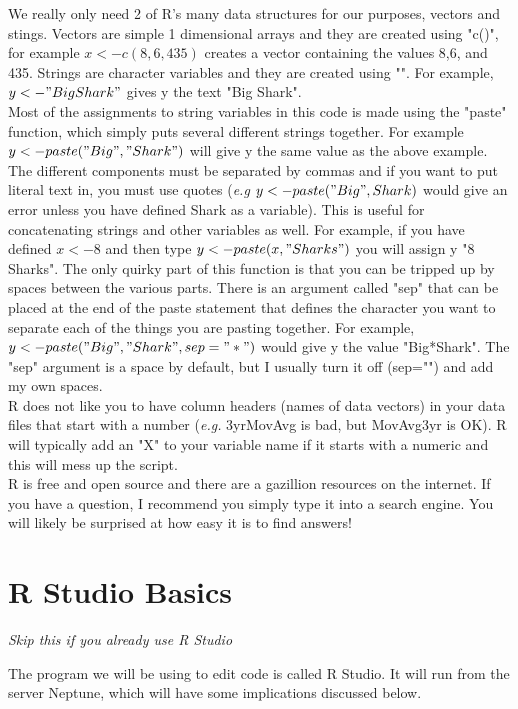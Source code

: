 \documentclass[]{report}
\begin{document}
We really only need 2 of R's many data structures for our purposes, vectors and stings. Vectors are simple 1 dimensional arrays and they are created using "c()", for example $x<-c(8,6,435)$ creates a vector containing the values 8,6, and 435.  Strings are character variables and they are created using "".  For example, $y<-"Big Shark"$ gives y the text "Big Shark".  \\

Most of the assignments to string variables in this code is made using the "paste" function, which simply puts several different strings together.  For example $y<-paste("Big","Shark")$ will give y the same value as the above example.  The different components must be separated by commas and if you want to put literal text in, you must use quotes (\textit{e.g} $y<-paste("Big",Shark)$ would give an error unless you have defined Shark as a variable).  This is useful for concatenating strings and other variables as well.  For example, if you have defined $x<-8$ and then type  $y<-paste(x," Sharks")$ you will assign y "8 Sharks".  The only quirky part of this function is that you can be tripped up by spaces between the various parts.  There is an argument called "sep" that can be placed at the end of the paste statement that defines the character you want to separate each of the things you are pasting together.  For example, $y<-paste("Big","Shark",sep="*")$ would give y the value "Big*Shark".  The "sep" argument is a space by default, but I usually turn it off (sep="") and add my own spaces.   \\

R does not like you to have column headers (names of data vectors) in your data files that start with a number (\textit{e.g.} 3yrMovAvg is bad, but MovAvg3yr is OK).  R will typically add an "X" to your variable name if it starts with a numeric and this will mess up the script. \\

R is free and open source and there are a gazillion resources on the internet.  If you have a question, I recommend you simply type it into a search engine.  You will likely be surprised at how easy it is to find answers!   


\section*{R Studio Basics}
\textit{Skip this if you already use R Studio}

The program we will be using to edit code is called R Studio.  It will run from the server Neptune, which will have some implications discussed below. \\
\end{document}
